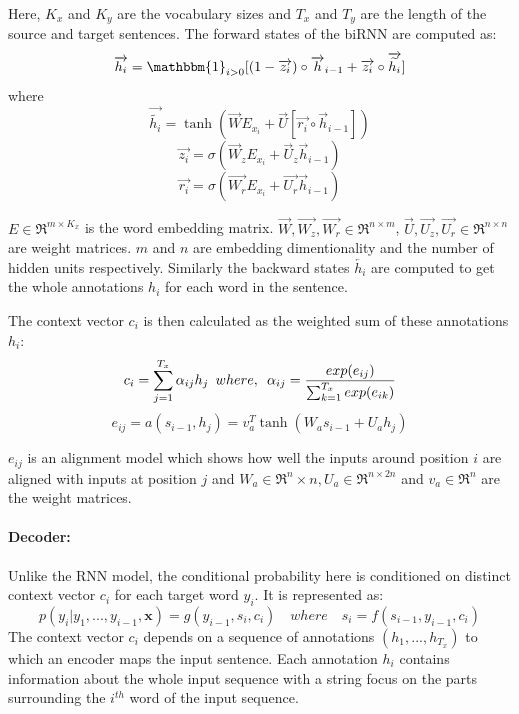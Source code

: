 \documentclass{article}
\begin{document}
	Here, \(K_x\) and \(K_y\) are the vocabulary sizes and \(T_x\) and \(T_y\) are the length of the source and target sentences. The forward states of the biRNN are computed as:
	\[\overrightarrow{h_i} = \mathbbm{1}_{i>0} [(1-\overrightarrow{z_i}) \circ \overrightarrow{h}_{i-1} + \overrightarrow{z_i} \circ \overrightarrow{\widetilde{h_i}}] \]
	where
	\[\overrightarrow{\widetilde{h_i}} = \tanh(\overrightarrow{W}E_{x_i} + \overrightarrow{U}[\overrightarrow{r_i} \circ \overrightarrow{h}_{i-1}])\] 
	\[\overrightarrow{z_i} = \sigma(\overrightarrow{W}_zE_{x_i} + \overrightarrow{U}_z\overrightarrow{h}_{i-1})\]
	\[\overrightarrow{r_i} = \sigma(\overrightarrow{W_r}E_{x_i} + \overrightarrow{U_r}\overrightarrow{h}_{i-1})\]
	
	\(E \in \Re^{m \times K_x}\) is the word embedding matrix. \(\overrightarrow{W}, \overrightarrow{W_z}, \overrightarrow{W_r} \in \Re^{n \times m}\), \(\overrightarrow{U}, \overrightarrow{U_z}, \overrightarrow{U_r} \in \Re^{n \times n}\) are weight matrices. \(m\) and \(n\) are embedding dimentionality and the number of hidden units respectively. Similarly the backward states \(\overleftarrow{h_i}\) are computed to get the whole annotations \(h_i\) for each word in the sentence. 
	
	The context vector \(c_i\) is then calculated as the weighted sum of these annotations \(h_i\):
	\[c_i = \sum_{j=1}^{T_x} \alpha_{ij}h_j \hspace{0.5em} where, \hspace{0.5em} \alpha_{ij} = \frac{exp(e_{ij})}{\sum_{k=1}^{T_x} exp(e_{ik})}\]
	\[e_{ij} = a(s_{i-1}, h_j) = v_a^T\tanh(W_as_{i-1} + U_ah_j)\]

	\(e_{ij}\) is an alignment model which shows how well the inputs around position \(i\) are aligned with inputs at position \(j\) and \(W_a \in \Re^n \times n, U_a \in \Re^{n \times 2n}\) and \(v_a \in \Re^n\) are the weight matrices. 
	
	\paragraph{Decoder: } Unlike the RNN model, the conditional probability here is conditioned on distinct context vector \(c_i\) for each target word \(y_i\). It is represented as:
	\[p(y_i | y_1, ..., y_{i-1}, \textbf{x}) = g(y_{i-1}, s_i, c_i)\hspace{1em} where \hspace{1em} 	s_i = f(s_{i-1}, y_{i-1}, c_i)\]
	The context vector \(c_i\) depends on a sequence of annotations \((h_1, ..., h_{T_x})\) to which an encoder maps the input sentence. Each annotation \(h_i\) contains information about the whole input sequence with a string focus on the parts surrounding the \(i^{th}\) word of the input sequence.
	
\end{document}
